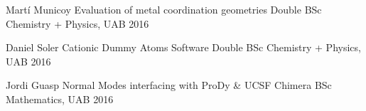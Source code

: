 \begin{cvhonors}
\cvhonor
    {Martí Municoy}
    {Evaluation of metal coordination geometries}
    {Double BSc Chemistry + Physics, UAB}
    {2016}

\cvhonor
    {Daniel Soler}
    {Cationic Dummy Atoms Software}
    {Double BSc Chemistry + Physics, UAB}
    {2016}

  \cvhonor
    {Jordi Guasp} %
    {Normal Modes interfacing with ProDy \& UCSF Chimera} %
    {BSc Mathematics, UAB} %
    {2016} %
\end{cvhonors}
